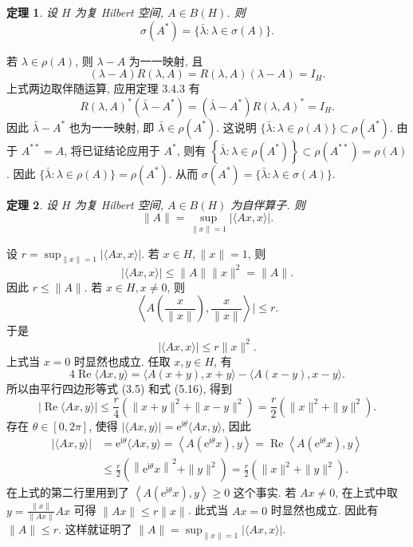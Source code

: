 \documentclass[openany]{ctexbook}
\makeatletter
\theoremstyle{kaiti}
\newtheorem{theorem}{定理}[section]
\theoremstyle{normal}
\renewenvironment{proof}[1][\proofname]{\par
    \pushQED{\qed}%
    \normalfont \topsep6\p@\@plus6\p@\relax
    \trivlist
    \item\relax
    {\heiti #1}\hspace{2\labelsep}\ignorespaces
  }{%
    \popQED\endtrivlist\@endpefalse
  }
\makeatother
\begin{document}
\begin{theorem}
设 $H$ 为复 Hilbert 空间, $A \in B(H)$. 则
$$
\sigma\left(A^{*}\right)=\{\bar{\lambda}: \lambda \in \sigma(A)\}.
$$
\end{theorem}

\begin{proof}
若 $\lambda \in \rho(A)$, 则 $\lambda-A$ 为一一映射, 且
$$
(\lambda-A) R(\lambda, A)=R(\lambda, A)(\lambda-A)=I_{H}.
$$
上式两边取伴随运算, 应用定理 3.4.3 有
$$
R(\lambda, A)^{*}\left(\bar{\lambda}-A^{*}\right)=\left(\bar{\lambda}-A^{*}\right) R(\lambda, A)^{*}=I_{H}.
$$
因此 $\bar{\lambda}-A^{*}$ 也为一一映射, 即 $\bar{\lambda} \in \rho\left(A^{*}\right)$. 这说明 $\{\bar{\lambda}: \lambda \in \rho(A)\} \subset \rho\left(A^{*}\right)$. 由于 $A^{* *}=A$, 将已证结论应用于 $A^{*}$, 则有 $\left\{\bar{\lambda}: \lambda \in \rho\left(A^{*}\right)\right\} \subset \rho\left(A^{* *}\right)=\rho(A)$. 因此 $\{\bar{\lambda}: \lambda \in \rho(A)\}=\rho\left(A^{*}\right)$. 从而 $\sigma\left(A^{*}\right)=\{\bar{\lambda}: \lambda \in \sigma(A)\}$.
\end{proof}

\begin{theorem}
设 $H$ 为复 Hilbert 空间, $A \in B(H)$ 为自伴算子. 则
$$
\|A\|=\sup_{\|x\|=1}|\langle A x, x\rangle|.
$$
\end{theorem}

\begin{proof}
设 $r=\sup_{\|x\|=1}|\langle A x, x\rangle|$. 若 $x \in H,\|x\|=1$, 则
$$
|\langle A x, x\rangle| \leqslant\|A\|\|x\|^2=\|A\|.
$$
因此 $r \leqslant\|A\|$.
若 $x \in H, x \neq 0$, 则
$$
\left\langle A\left(\frac{x}{\|x\|}\right), \frac{x}{\|x\|}\right\rangle \mid \leqslant r.
$$
于是
\begin{equation}
  |\langle A x, x\rangle| \leqslant r\|x\|^2.
\end{equation}
上式当 $x=0$ 时显然也成立. 任取 $x, y \in H$, 有
$$
4 \operatorname{Re}\langle A x, y\rangle=\langle A(x+y), x+y\rangle-\langle A(x-y), x-y\rangle.
$$
所以由平行四边形等式 (3.5) 和式 (5.16), 得到
$$
|\operatorname{Re}\langle A x, y\rangle| \leqslant \frac{r}{4}\left(\|x+y\|^2+\|x-y\|^2\right)=\frac{r}{2}\left(\|x\|^2+\|y\|^2\right).
$$
存在 $\theta \in[0,2 \pi]$, 使得 $|\langle A x, y\rangle|=\mathrm{e}^{\mathrm{i} \theta}\langle A x, y\rangle$, 因此
$$
\begin{aligned}
|\langle A x, y\rangle| &=\mathrm{e}^{\mathrm{i} \theta}\langle A x, y\rangle=\left\langle A\left(\mathrm{e}^{\mathrm{i} \theta} x\right), y\right\rangle=\operatorname{Re}\left\langle A\left(\mathrm{e}^{\mathrm{i} \theta} x\right), y\right\rangle \\
& \leqslant \frac{r}{2}\left(\left\|\mathrm{e}^{\mathrm{i} \theta} x\right\|^2+\|y\|^2\right)=\frac{r}{2}\left(\|x\|^2+\|y\|^2\right).
\end{aligned}
$$
在上式的第二行里用到了 $\left\langle A\left(\mathrm{e}^{\mathrm{i} \theta} x\right), y\right\rangle \geqslant 0$ 这个事实. 若 $A x \neq 0$, 在上式中取 $y=\frac{\|x\|}{\|A x\|} A x$ 可得 $\|A x\| \leqslant r\|x\|$. 此式当 $A x=0$ 时显然也成立. 因此有 $\|A\| \leqslant r$. 这样就证明了 $\|A\|=\sup_{\|x\|=1}|\langle A x, x\rangle|$.
\end{proof}
\end{document}

